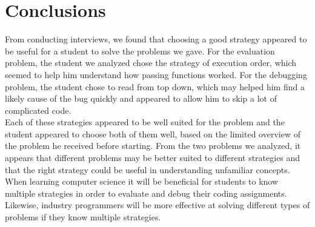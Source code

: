 \section{Conclusions}
From conducting interviews, we found that choosing a good strategy appeared to be useful for a student to solve the problems we gave. 
For the evaluation problem, the student we analyzed chose the strategy of execution order, which seemed to help him understand how passing functions worked. 
For the debugging problem, the student chose to read from top down, which may helped him find a likely cause of the bug quickly and appeared to allow him to skip a lot of complicated code.  \\

Each of these strategies appeared to be well suited for the problem and the student appeared to choose both of them well, based on the limited overview of the problem he received before starting. 
From the two problems we analyzed, it appears that different problems may be better suited to different strategies and that the right strategy could be useful in understanding unfamiliar concepts. 
When learning computer science it will be beneficial for students to know multiple strategies in order to evaluate and debug their coding assignments. Likewise, industry programmers will be more effective at solving different types of problems if they know multiple strategies. \\


